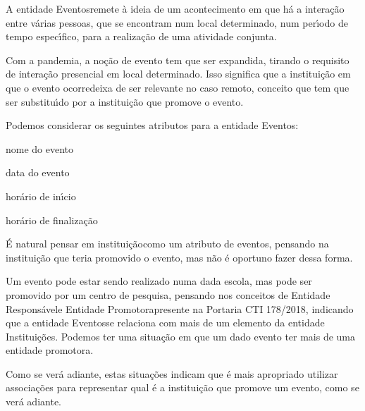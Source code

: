 \documentclass[
12pt,		%
openright,	%
twoside,  %
a4paper,			%
chapter=TITLE,		%
english,			%
french,				%
spanish,			%
brazil				%
]{USPSC-classe/USPSC}
\begin{document}
\noindent\begin{center}\mbox{\centering{}}\end{center}


A entidade \textquotedbl Eventos\textquotedbl  remete \`a ideia de um acontecimento em que h\'a a intera\c{c}\~ao entre v\'arias pessoas, que se encontram num local determinado, num per\'{\i}odo de tempo espec\'{\i}fico, para a realiza\c{c}\~ao de uma atividade conjunta.


Com a pandemia, a no\c{c}\~ao de evento tem que ser expandida, tirando o requisito de intera\c{c}\~ao presencial em local determinado. Isso significa que \textquotedbl a institui\c{c}\~ao em que o evento ocorre\textquotedbl  deixa de ser relevante no caso remoto, conceito que tem que ser substitu\'{\i}do por \textquotedbl a institui\c{c}\~ao que promove o evento\textquotedbl .


Podemos considerar os seguintes atributos para a entidade \textquotedbl Eventos\textquotedbl :



\begin{alineas}
\item nome do evento
\item data do evento
\item hor\'ario de in\'{\i}cio
\item hor\'ario de finaliza\c{c}\~ao
\end{alineas}

\'E natural pensar em \textquotedbl institui\c{c}\~ao\textquotedbl  como um atributo de eventos, pensando na institui\c{c}\~ao que teria promovido o evento, mas n\~ao \'e oportuno fazer dessa forma.


Um evento pode estar sendo realizado numa dada escola, mas pode ser promovido por um centro de pesquisa, pensando nos conceitos de \textquotedbl Entidade Respons\'avel\textquotedbl  e \textquotedbl Entidade Promotora\textquotedbl  presente na Portaria CTI 178/2018, indicando que a entidade \textquotedbl Eventos\textquotedbl  se relaciona com mais de um elemento da entidade \textquotedbl Institui\c{c}\~oes\textquotedbl . Podemos ter uma situa\c{c}\~ao em que um dado evento ter mais de uma entidade promotora.


Como se ver\'a adiante, estas situa\c{c}\~oes indicam que \'e mais apropriado utilizar associa\c{c}\~oes para representar qual \'e a institui\c{c}\~ao que promove um evento, como se ver\'a adiante.
\end{document}
